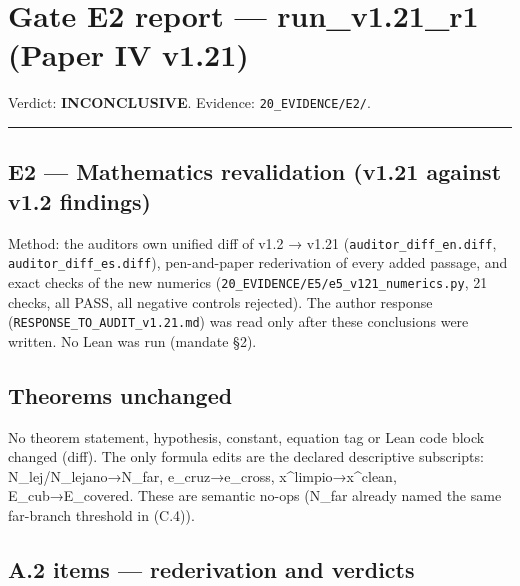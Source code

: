 \documentclass[
]{article}
\author{}
\date{}
\begin{document}
\section{Gate E2 report --- run\_v1.21\_r1 (Paper IV
v1.21)}\label{gate-e2-report--run_v121_r1-paper-iv-v121}

Verdict: \textbf{INCONCLUSIVE}. Evidence: \texttt{20\_EVIDENCE/E2/}.

\begin{center}\rule{0.5\linewidth}{0.5pt}\end{center}

\subsection{E2 --- Mathematics revalidation (v1.21 against v1.2
findings)}\label{e2--mathematics-revalidation-v121-against-v12-findings}

Method: the auditor\textquotesingle s own unified diff of v1.2 → v1.21
(\texttt{auditor\_diff\_en.diff}, \texttt{auditor\_diff\_es.diff}),
pen-and-paper rederivation of every added passage, and exact checks of
the new numerics (\texttt{20\_EVIDENCE/E5/e5\_v121\_numerics.py}, 21
checks, all PASS, all negative controls rejected). The author response
(\texttt{RESPONSE\_TO\_AUDIT\_v1.21.md}) was read only after these
conclusions were written. No Lean was run (mandate §2).

\subsection{Theorems unchanged}\label{theorems-unchanged}

No theorem statement, hypothesis, constant, equation tag or Lean code
block changed (diff). The only formula edits are the declared
descriptive subscripts: N\_lej/N\_lejano→N\_far, e\_cruz→e\_cross,
x\^{}limpio→x\^{}clean, E\_cub→E\_covered. These are semantic no-ops
(N\_far already named the same far-branch threshold in (C.4)).

\subsection{A.2 items --- rederivation and
verdicts}\label{a2-items--rederivation-and-verdicts}
\end{document}
